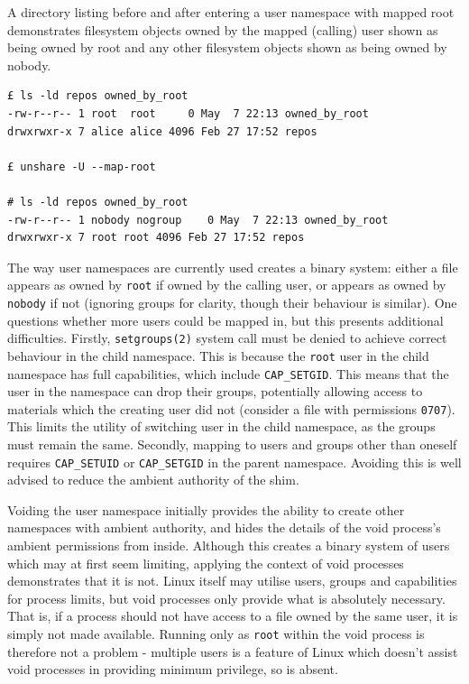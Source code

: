 \documentclass[12pt,a4paper,twoside]{report}
\begin{document}
\begin{listing}
\label{lst:mapped-root-directory}
\caption{A directory listing before and after entering a user namespace with mapped root demonstrates filesystem objects owned by the mapped (calling) user shown as being owned by root and any other filesystem objects shown as being owned by nobody.}

\begin{verbatim}
£ ls -ld repos owned_by_root
-rw-r--r-- 1 root  root     0 May  7 22:13 owned_by_root
drwxrwxr-x 7 alice alice 4096 Feb 27 17:52 repos

£ unshare -U --map-root

# ls -ld repos owned_by_root
-rw-r--r-- 1 nobody nogroup    0 May  7 22:13 owned_by_root
drwxrwxr-x 7 root root 4096 Feb 27 17:52 repos
\end{verbatim}
\end{listing}

The way user namespaces are currently used creates a binary system: either a file appears as owned by \texttt{root} if owned by the calling user, or appears as owned by \texttt{nobody} if not (ignoring groups for clarity, though their behaviour is similar). One questions whether more users could be mapped in, but this presents additional difficulties. Firstly, \texttt{setgroups(2)} system call must be denied to achieve correct behaviour in the child namespace. This is because the \texttt{root} user in the child namespace has full capabilities, which include \texttt{CAP\_SETGID}. This means that the user in the namespace can drop their groups, potentially allowing access to materials which the creating user did not (consider a file with permissions \texttt{0707}). This limits the utility of switching user in the child namespace, as the groups must remain the same. Secondly, mapping to users and groups other than oneself requires \texttt{CAP\_SETUID} or \texttt{CAP\_SETGID} in the parent namespace. Avoiding this is well advised to reduce the ambient authority of the shim.

Voiding the user namespace initially provides the ability to create other namespaces with ambient authority, and hides the details of the void process's ambient permissions from inside. Although this creates a binary system of users which may at first seem limiting, applying the context of void processes demonstrates that it is not. Linux itself may utilise users, groups and capabilities for process limits, but void processes only provide what is absolutely necessary. That is, if a process should not have access to a file owned by the same user, it is simply not made available. Running only as \texttt{root} within the void process is therefore not a problem - multiple users is a feature of Linux which doesn't assist void processes in providing minimum privilege, so is absent.
\end{document}

